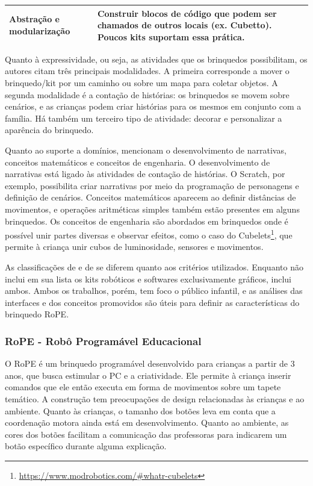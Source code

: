 \begin{quadro}[!htbp]
\begin{center}
\begin{footnotesize}
\begin{tabular}{|p{3cm}|p{12cm}|}
    Abstração e modularização & Construir blocos de código que podem ser chamados de outros locais (ex. Cubetto). Poucos kits suportam essa prática. \\ \hline

\end{tabular}
 
 \end{footnotesize}
 \end{center} 
\end{quadro}

Quanto à expressividade, ou seja, as atividades que os brinquedos possibilitam, os autores citam três principais modalidades. A primeira corresponde a mover o brinquedo/kit por um caminho ou sobre um mapa para coletar objetos. A segunda modalidade é a contação de histórias: os brinquedos se movem sobre cenários, e as crianças podem criar histórias para os mesmos em conjunto com a família. Há também um terceiro tipo de atividade: decorar e personalizar a aparência do brinquedo.

Quanto ao suporte a domínios,  mencionam o desenvolvimento de narrativas, conceitos matemáticos e conceitos de engenharia. O desenvolvimento de narrativas está ligado às atividades de contação de histórias. O Scratch, por exemplo, possibilita criar narrativas por meio da programação de personagens e definição de cenários. Conceitos matemáticos aparecem ao definir distâncias de movimentos, e operações aritméticas simples também estão presentes em alguns brinquedos. Os conceitos de engenharia são abordados em brinquedos onde é possível unir partes diversas e observar efeitos, como o caso do Cubelets\footnote{\url{https://www.modrobotics.com/\#whatr-cubelets}}, que permite à criança unir cubos de luminosidade, sensores e movimentos.

As classificações de  e de  se diferem quanto aos critérios utilizados. Enquanto  não inclui em sua lista os kits robóticos e softwares exclusivamente gráficos,  inclui ambos. Ambos os trabalhos, porém, tem foco o público infantil, e as análises das interfaces e dos conceitos promovidos são úteis para definir as características do brinquedo RoPE.

\subsubsection{RoPE - Robô Programável Educacional}
O RoPE é um brinquedo programável desenvolvido para crianças a partir de 3 anos, que busca estimular o \acl{PC} e a criatividade. Ele permite à criança inserir comandos que ele então executa em forma de movimentos sobre um tapete temático. A construção tem preocupações de design relacionadas às crianças e ao ambiente. Quanto às crianças, o tamanho dos botões leva em conta que a coordenação motora ainda está em desenvolvimento. Quanto ao ambiente, as cores dos botões facilitam a comunicação das professoras para indicarem um botão específico durante alguma explicação.

